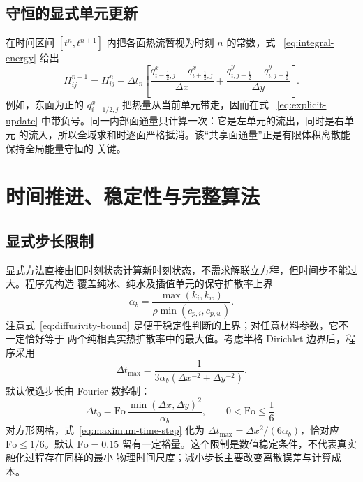 \documentclass[UTF8,11pt]{ctexart}
\numberwithin{equation}{section}
\begin{document}
\subsection{守恒的显式单元更新}

在时间区间 $[t^n,t^{n+1}]$ 内把各面热流暂视为时刻 $n$ 的常数，式
~\eqref{eq:integral-energy} 给出
\begin{equation}
\boxed{
      H_{ij}^{n+1}=H_{ij}^{n}+\Delta t_n
      \left[
      \frac{q^x_{i-\frac12,j}-q^x_{i+\frac12,j}}{\Delta x}
      +
      \frac{q^y_{i,j-\frac12}-q^y_{i,j+\frac12}}{\Delta y}
      \right].
}
      \label{eq:explicit-update}
\end{equation}
例如，东面为正的 $q^x_{i+1/2,j}$ 把热量从当前单元带走，因而在式
~\eqref{eq:explicit-update} 中带负号。同一内部面通量只计算一次：它是左单元的流出，同时是右单元
的流入，所以全域求和时逐面严格抵消。该“共享面通量”正是有限体积离散能保持全局能量守恒的
关键。

\section{时间推进、稳定性与完整算法}

\subsection{显式步长限制}

显式方法直接由旧时刻状态计算新时刻状态，不需求解联立方程，但时间步不能过大。程序先构造
覆盖纯冰、纯水及插值单元的保守扩散率上界
\begin{equation}
      \alpha_b
      =\frac{\max(k_i,k_w)}
      {\rho\min(c_{p,i},c_{p,w})}.
      \label{eq:diffusivity-bound}
\end{equation}
注意式~\eqref{eq:diffusivity-bound} 是便于稳定性判断的上界；对任意材料参数，它不一定恰好等于
两个纯相真实热扩散率中的最大值。考虑半格 Dirichlet 边界后，程序采用
\begin{equation}
      \Delta t_{\max}
      =\frac{1}
      {3\alpha_b\left(\Delta x^{-2}+\Delta y^{-2}\right)}.
      \label{eq:maximum-time-step}
\end{equation}
默认候选步长由 Fourier 数控制：
\begin{equation}
      \Delta t_0
      =\mathrm{Fo}\,
      \frac{\min(\Delta x,\Delta y)^2}{\alpha_b},
      \qquad 0<\mathrm{Fo}\le\frac16.
      \label{eq:default-time-step}
\end{equation}
对方形网格，式~\eqref{eq:maximum-time-step} 化为
$\Delta t_{\max}=\Delta x^2/(6\alpha_b)$，恰对应 $\mathrm{Fo}\le1/6$。默认
$\mathrm{Fo}=0.15$ 留有一定裕量。这个限制是数值稳定条件，不代表真实融化过程存在同样的最小
物理时间尺度；减小步长主要改变离散误差与计算成本。
\end{document}
